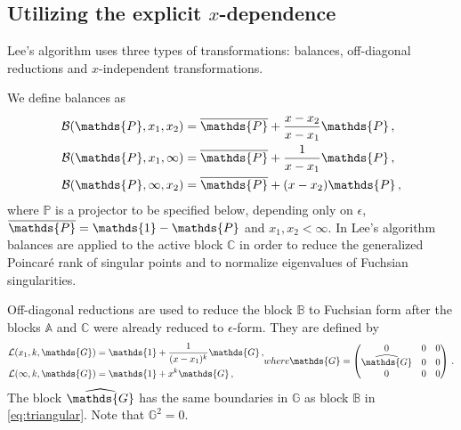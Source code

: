 \documentclass[12pt]{article}
\numberwithin{equation}{section}
\numberwithin{figure}{section}
\newcommand{\A}{\mathds{A}}
\newcommand{\B}{\mathds{B}}
\newcommand{\C}{\mathds{C}}
\newcommand{\G}{\mathds{G}}
\newcommand{\id}{\mathds{1}}
\renewcommand{\P}{\mathds{P}}
\newcommand{\Pbar}{\overline\P}
\begin{document}
    \subsection{Utilizing the explicit $x$-dependence}
      Lee's algorithm uses three types of transformations: balances, off-diagonal reductions and $x$-independent transformations.

      We define balances as
      \begin{subequations} \label{eq:bal}
        \begin{align}
          {\cal B}(\P,x_1,x_2) &= \Pbar + \frac{x-x_2}{x-x_1} \P\,, \label{eq:bal_x1_x2} \\
          {\cal B}(\P,x_1,\infty) &= \Pbar + \frac1{x-x_1} \P\,, \label{eq:bal_x1_inf} \\
          {\cal B}(\P,\infty,x_2) &= \Pbar + (x-x_2) \P\,, \label{eq:bal_inf_x2}
        \end{align}
      \end{subequations}        
      where $\P$ is a projector to be specified below, depending only on $\epsilon$, $\Pbar = \id - \P$ and $x_1,x_2 < \infty$.
      In Lee's algorithm balances are applied to the active block $\C$ in order to reduce the generalized Poincar\'{e} rank of singular points and to normalize eigenvalues of Fuchsian singularities.
      
      Off-diagonal reductions are used to reduce the block $\B$ to Fuchsian form after the blocks $\A$ and $\C$ were already reduced to $\epsilon$-form.
      They are defined by
      \begin{subequations} \label{eq:offred}
        \begin{align}
          {\cal L}(x_1,k,\G) &= \id + \frac1{(x-x_1)^k} \G\,, \label{eq:offred1} \\
          {\cal L}(\infty,k,\G) &= \id + x^k \G\,, \label{eq:offred2}
        \end{align}
        where
        \begin{equation} \label{eq:offredG}
          \G =
          \begin{pmatrix}
            0 & 0 & 0 \\ 
            \widehat\G & 0 & 0 \\ 
            0 & 0 & 0 
          \end{pmatrix}\,.
        \end{equation}
      \end{subequations}        
      The block $\widehat\G$ has the same boundaries in $\G$ as block $\B$ in \eqref{eq:triangular}. Note that $\G^2 = 0$.
\end{document}
